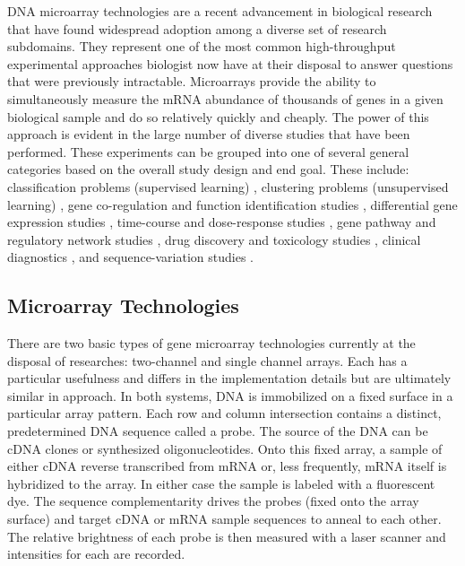 DNA microarray technologies are a recent advancement in biological research
that have found widespread adoption among a diverse set of research subdomains.
They represent one of the most common high-throughput experimental approaches
biologist now have at their disposal to answer questions that were previously
intractable. Microarrays provide the ability to simultaneously measure the mRNA
abundance of thousands of genes in a given biological sample and do so
relatively quickly and cheaply.  The power of this approach is evident in the
large number of diverse studies that have been performed.  These experiments
can be grouped into one of several general categories based on the overall
study design and end goal.  These include: classification problems (supervised
learning) \cite{Dudoit2003ICM}, clustering problems (unsupervised learning)
\cite{Azuaje2003cge,Stanford2003cac}, gene co-regulation and function
identification studies \cite{PMID_12413821}, differential gene expression
studies \cite{PMID_15843092,PMID_15867208}, time-course and dose-response
studies \cite{PMID_12443997}, gene pathway and regulatory network studies
\cite{PMID_16216773,PMID_16825123}, drug discovery and toxicology studies
\cite{PMID_16512775,PMID_16700885,PMID_16880944,PMID_17195470}, clinical
diagnostics \cite{PMID_16918486}, and sequence-variation studies
\cite{PMID_17265721}.

\subsection{Microarray Technologies}

There are two basic types of gene microarray technologies currently at the
disposal of researches: two-channel and single channel arrays.  Each has a
particular usefulness and differs in the implementation details but are
ultimately similar in approach.  In both systems, DNA is immobilized on a fixed
surface in a particular array pattern.  Each row and column intersection
contains a distinct, predetermined DNA sequence called a probe. The source of
the DNA can be cDNA clones or synthesized oligonucleotides.  Onto this fixed
array, a sample of either cDNA reverse transcribed from mRNA or, less
frequently, mRNA itself is hybridized to the array.  In either case the sample
is labeled with a fluorescent dye.  The sequence complementarity drives the
probes (fixed onto the array surface) and target cDNA or mRNA sample sequences
to anneal to each other.  The relative brightness of each probe is then
measured with a laser scanner and intensities for each are recorded.

